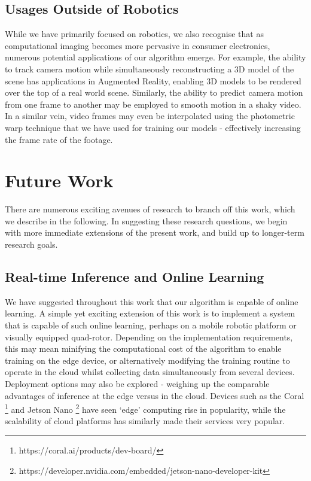 \subsection{Usages Outside of Robotics}
While we have primarily focused on robotics, we also recognise that as computational imaging becomes more pervasive in consumer electronics, numerous potential applications of our algorithm emerge. For example, the ability to track camera motion while simultaneously reconstructing a 3D model of the scene has applications in Augmented Reality, enabling 3D models to be rendered over the top of a real world scene. Similarly, the ability to predict camera motion from one frame to another may be employed to smooth motion in a shaky video. In a similar vein, video frames may even be interpolated using the photometric warp technique that we have used for training our models - effectively increasing the frame rate of the footage.

\section{Future Work}

There are numerous exciting avenues of research to branch off this work, which we describe in the following. In suggesting these research questions, we begin with more immediate extensions of the present work, and build up to longer-term research goals. 

\subsection{Real-time Inference and Online Learning}
We have suggested throughout this work that our algorithm is capable of online learning. A simple yet exciting extension of this work is to implement a system that is capable of such online learning, perhaps on a mobile robotic platform or visually equipped quad-rotor. Depending on the implementation requirements, this may mean minifying the computational cost of the algorithm to enable training on the edge device, or alternatively modifying the training routine to operate in the cloud whilst collecting data simultaneously from several devices. Deployment options may also be explored - weighing up the comparable advantages of inference at the edge versus in the cloud. Devices such as the Coral \footnote{https://coral.ai/products/dev-board/} and Jetson Nano \footnote{https://developer.nvidia.com/embedded/jetson-nano-developer-kit} have seen `edge' computing rise in popularity, while the scalability of cloud platforms has similarly made their services very popular. 


